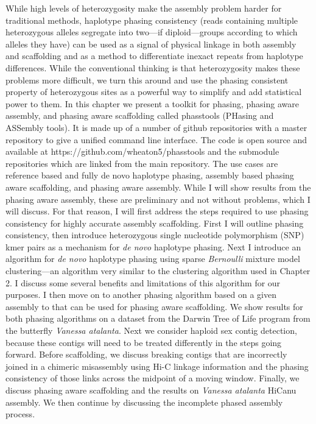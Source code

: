 \par{
While high levels of heterozygosity make the assembly problem harder for traditional methods, haplotype phasing consistency (reads containing multiple heterozygous alleles segregate into two---if diploid---groups according to which alleles they have) can be used as a signal of physical linkage in both assembly and scaffolding and as a method to differentiate inexact repeats from haplotype differences. While the conventional thinking is that heterozygosity makes these problems more difficult, we turn this around and use the phasing consistent property of heterozygous sites as a powerful way to simplify and add statistical power to them. In this chapter we present a toolkit for phasing, phasing aware assembly, and phasing aware scaffolding called phasstools (PHasing and ASSembly tools). It is made up of a number of github repositories with a master repository to give a unified command line interface. The code is open source and available at https://github.com/wheaton5/phasstools and the submodule repositories which are linked from the main repository. The use cases are reference based and fully de novo haplotype phasing, assembly based phasing aware scaffolding, and phasing aware assembly. While I will show results from the phasing aware assembly, these are preliminary and not without problems, which I will discuss. For that reason, I will first address the steps required to use phasing consistency for highly accurate assembly scaffolding. First I will outline phasing consistency, then introduce heterozygous single nucleotide polymorphism (SNP) kmer pairs as a mechanism for \textit{de novo} haplotype phasing. Next I introduce an algorithm for \textit{de novo} haplotype phasing using sparse \textit{Bernoulli} mixture model clustering---an algorithm very similar to the clustering algorithm used in Chapter 2. I discuss some several benefits and limitations of this algorithm for our purposes. I then move on to another phasing algorithm based on a given assembly to that can be used for phasing aware scaffolding. We show results for both phasing algorithms on a dataset from the Darwin Tree of Life program from the butterfly \textit{Vanessa atalanta}. Next we consider haploid sex contig detection, because these contigs will need to be treated differently in the steps going forward. Before scaffolding, we discuss breaking contigs that are incorrectly joined in a chimeric misassembly using Hi-C linkage information and the phasing consistency of those links across the midpoint of a moving window. Finally, we discuss phasing aware scaffolding and the results on \textit{Vanessa atalanta} HiCanu assembly. We then continue by discussing the incomplete phased assembly process. 
}



